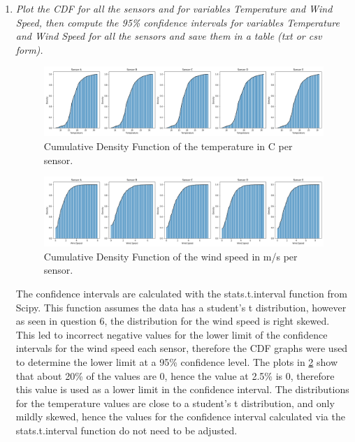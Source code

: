 \documentclass[a4paper,12pt]{article} %
\begin{document}
\begin{enumerate}
\item {\it Plot the CDF for all the sensors and for variables Temperature and Wind Speed, then compute the 95\% confidence intervals for variables Temperature and Wind Speed for all the sensors and save them in a table (txt or csv form).}

\begin{figure}[H] 
	\centering
	\includegraphics[width=1\textwidth]{CDF of temperature per sensor.png} 
	\caption{Cumulative Density Function of the temperature in \degree C per sensor.} %
	\label{fig:CDF_T}
\end{figure}  

\begin{figure}[H] 
	\centering
	\includegraphics[width=1\textwidth]{CDF of wind speed per sensor.png} 
	\caption{Cumulative Density Function of the wind speed in m/s per sensor.} %
	\label{fig:CDF_W}
\end{figure} 

The confidence intervals are calculated with the stats.t.interval function from Scipy. This function assumes the data has a student's t distribution, however as seen in question 6, the distribution for the wind speed is right skewed. This led to incorrect negative values for the lower limit of the confidence intervals for the wind speed each sensor, therefore the CDF graphs were used to determine the lower limit at a 95\% confidence level. The plots in \ref{fig:CDF_W} show that about 20\% of the values are 0, hence the value at 2.5\% is 0, therefore this value is used as a lower limit in the confidence interval. The distributions for the temperature values are close to a student's t distribution, and only mildly skewed, hence the values for the confidence interval calculated via the stats.t.interval function do not need to be adjusted. 


\end{enumerate}
\end{document}
